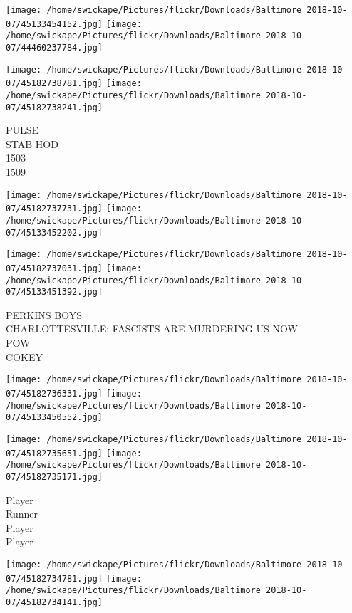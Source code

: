 \documentclass[10pt,letterpaper]{article}
\begin{document}
\texttt{[image: /home/swickape/Pictures/flickr/Downloads/Baltimore 2018-10-07/45133454152.jpg]}
\texttt{[image: /home/swickape/Pictures/flickr/Downloads/Baltimore 2018-10-07/44460237784.jpg]}

\texttt{[image: /home/swickape/Pictures/flickr/Downloads/Baltimore 2018-10-07/45182738781.jpg]}
\texttt{[image: /home/swickape/Pictures/flickr/Downloads/Baltimore 2018-10-07/45182738241.jpg]}

PULSE\\
STAB HOD\\
1503\\
1509\\
\pagebreak

\texttt{[image: /home/swickape/Pictures/flickr/Downloads/Baltimore 2018-10-07/45182737731.jpg]}
\texttt{[image: /home/swickape/Pictures/flickr/Downloads/Baltimore 2018-10-07/45133452202.jpg]}

\texttt{[image: /home/swickape/Pictures/flickr/Downloads/Baltimore 2018-10-07/45182737031.jpg]}
\texttt{[image: /home/swickape/Pictures/flickr/Downloads/Baltimore 2018-10-07/45133451392.jpg]}

PERKINS BOYS\\
CHARLOTTESVILLE: FASCISTS ARE MURDERING US NOW\\
POW\\
COKEY\\
\pagebreak

\texttt{[image: /home/swickape/Pictures/flickr/Downloads/Baltimore 2018-10-07/45182736331.jpg]}
\texttt{[image: /home/swickape/Pictures/flickr/Downloads/Baltimore 2018-10-07/45133450552.jpg]}

\texttt{[image: /home/swickape/Pictures/flickr/Downloads/Baltimore 2018-10-07/45182735651.jpg]}
\texttt{[image: /home/swickape/Pictures/flickr/Downloads/Baltimore 2018-10-07/45182735171.jpg]}

Player\\
Runner\\
Player\\
Player\\
\pagebreak

\texttt{[image: /home/swickape/Pictures/flickr/Downloads/Baltimore 2018-10-07/45182734781.jpg]}
\texttt{[image: /home/swickape/Pictures/flickr/Downloads/Baltimore 2018-10-07/45182734141.jpg]}
\end{document}
